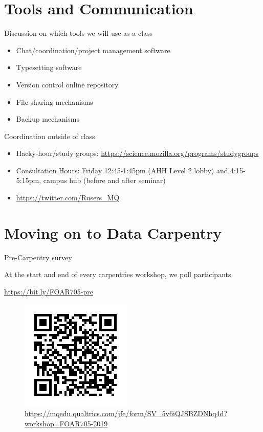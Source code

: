 \documentclass[aspectratio=169, 11pt]{beamer} %
\begin{document}
\section{Tools and Communication}
\begin{frame}{Discussion on which tools we will use as a class}

\begin{itemize}[label=\textbullet]
    \item Chat/coordination/project management software
    \item Typesetting software
    \item Version control online repository
    \item File sharing mechanisms
    \item Backup mechanisms
\end{itemize}

\end{frame}

\begin{frame}{Coordination outside of class}

\begin{itemize}[label=\textbullet]
    \item Hacky-hour/study groups: \url{https://science.mozilla.org/programs/studygroups}
    \item Consultation Hours: Friday 12:45-1:45pm (AHH Level 2 lobby) and 4:15-5:15pm, campus hub (before and after seminar)
    \item \url{https://twitter.com/Rusers_MQ}
\end{itemize}

\end{frame}

\section{Moving on to Data Carpentry}


\begin{frame}{Pre-Carpentry survey}

At the start and end of every carpentries workshop, we poll participants.

\url{https://bit.ly/FOAR705-pre}

\begin{figure}[H]
        \centering
        \includegraphics[height=.6\textheight]{figures/qr.jpeg}
        \caption{\url{https://mqedu.qualtrics.com/jfe/form/SV_5v6iQJSBZDNhq4d?workshop=FOAR705-2019}}
        \label{fig:foarqr}
    \end{figure}
    
\end{frame}
\end{document}
